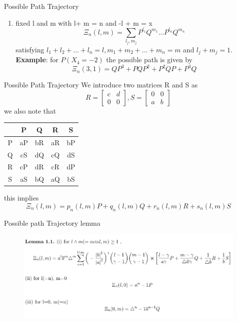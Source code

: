 \documentclass[xcolor=svgnames]{beamer}
\begin{document}
\begin{frame}{Possible Path Trajectory}
\begin{enumerate}
    \item fixed l and m with l+ m = n and -l + m = x
    $$ \Xi_n(l,m) = \sum_{l_j,m_j} P^{l_1}Q^{m_1} \hdots P^{l_n}Q^{m_n}  $$
satisfying $l_1 + l_2 + \hdots + l_n=l, m_1 + m_2+ \hdots +m_n = m$ and $l_j + m_j = 1$.\\
\textbf{Example}: for $P(X_4 =-2)$ the possible path is given by
$$  \Xi_n(3,1) = QP^3 + PQP^2 + P^2QP + P^3Q$$
\end{enumerate}
\end{frame}

\begin{frame}{Possible Path Trajectory}
We introduce two matrices R and S as
$$  R= \begin{bmatrix}
        c&d\\
        0&0
\end{bmatrix}, S=\begin{bmatrix}
    0&0\\
    a&b
\end{bmatrix}$$
we also note that
\begin{center}
\begin{tabular}{ c | c  c  c  c  }
   & P & Q & R & S\\
   \hline
  P & aP & bR & aR & bP\\
  Q & cS & dQ & cQ & dS\\
  R & cP & dR & cR & dP\\
  S & aS & bQ & aQ & bS
    \end{tabular}
\end{center}
this implies
$$\Xi_n(l,m) = p_n(l,m)P +q_n(l,m)Q +r_n(l,m)R + s_n(l,m)S $$
\end{frame}

\begin{frame}{Possible path Trajectory lemma}
\begin{figure}
    \centering
    \includegraphics[width = 12cm]{Lemma1_1.png}
\end{figure}
\end{frame}
\end{document}
